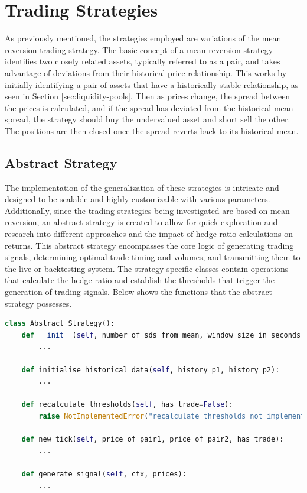 \chapter{Trading Strategies}
\label{sec:strats}
As previously mentioned, the strategies employed are variations of the mean reversion trading strategy. The basic concept of a mean reversion strategy identifies two closely related assets, typically referred to as a pair, and takes advantage of deviations from their historical price relationship. This works by initially identifying a pair of assets that have a historically stable relationship, as seen in Section \ref{sec:liquidity-pools}. Then as prices change, the spread between the prices is calculated, and if the spread has deviated from the historical mean spread, the strategy should buy the undervalued asset and short sell the other. The positions are then closed once the spread reverts back to its historical mean.

\section{Abstract Strategy}
The implementation of the generalization of these strategies is intricate and designed to be scalable and highly customizable with various parameters. Additionally, since the trading strategies being investigated are based on mean reversion, an abstract strategy is created to allow for quick exploration and research into different approaches and the impact of hedge ratio calculations on returns. This abstract strategy encompasses the core logic of generating trading signals, determining optimal trade timing and volumes, and transmitting them to the live or backtesting system. The strategy-specific classes contain operations that calculate the hedge ratio and establish the thresholds that trigger the generation of trading signals. Below shows the functions that the abstract strategy possesses.
\begin{lstlisting}[language=Python]
class Abstract_Strategy():
    def __init__(self, number_of_sds_from_mean, window_size_in_seconds, percent_to_invest, strategy_name, gas_price_threshold, rebalance_threshold_as_percent_of_initial_investment):
        ...

    def initialise_historical_data(self, history_p1, history_p2):
        ...

    def recalculate_thresholds(self, has_trade=False):
        raise NotImplementedError("recalculate_thresholds not implemented")

    def new_tick(self, price_of_pair1, price_of_pair2, has_trade):
        ...

    def generate_signal(self, ctx, prices):
        ...

\end{lstlisting}

